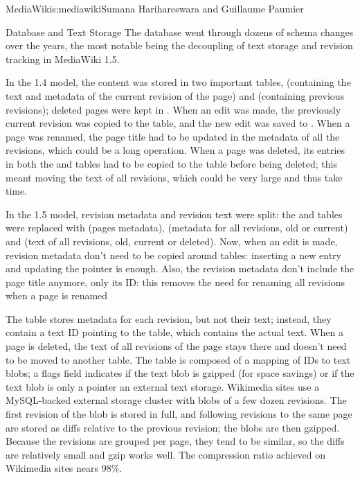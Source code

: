 \begin{aosachapter}{MediaWiki}{s:mediawiki}{Sumana Harihareswara and Guillaume Paumier}
\begin{aosasect1}{Database and Text Storage}
The database went through dozens of schema changes over the years, the
most notable being the decoupling of text storage and revision
tracking in MediaWiki 1.5.


In the 1.4 model, the content was stored in two important tables,
 (containing the text and metadata of the current revision
of the page) and  (containing previous revisions); deleted
pages were kept in . When an edit was made, the
previously current revision was copied to the  table, and
the new edit was saved to . When a page was renamed, the
page title had to be updated in the metadata of all the 
revisions, which could be a long operation. When a page was deleted,
its entries in both the  and  tables had to be
copied to the  table before being deleted; this meant
moving the text of all revisions, which could be very large and thus
take time.

In the 1.5 model, revision metadata and revision text were split: the
 and  tables were replaced with  (pages
metadata),  (metadata for all revisions, old or
current) and  (text of all revisions, old, current or
deleted). Now, when an edit is made, revision metadata don't need to
be copied around tables: inserting a new entry and updating the
 pointer is enough. Also, the revision metadata
don't include the page title anymore, only its ID: this removes the
need for renaming all revisions when a page is renamed

The  table stores metadata for each revision, but not
their text; instead, they contain a text ID pointing to the
 table, which contains the actual text. When a page is
deleted, the text of all revisions of the page stays there and doesn't
need to be moved to another table. The  table is composed
of a mapping of IDs to text blobs; a flags field indicates if the text
blob is gzipped (for space savings) or if the text blob is only a
pointer an external text storage. Wikimedia sites use a MySQL-backed
external storage cluster with blobs of a few dozen revisions. The
first revision of the blob is stored in full, and following revisions
to the same page are stored as diffs relative to the previous
revision; the blobs are then gzipped. Because the revisions are
grouped per page, they tend to be similar, so the diffs are relatively
small and gzip works well. The compression ratio achieved on Wikimedia
sites nears 98\%.


\end{aosasect1}
\end{aosachapter}
